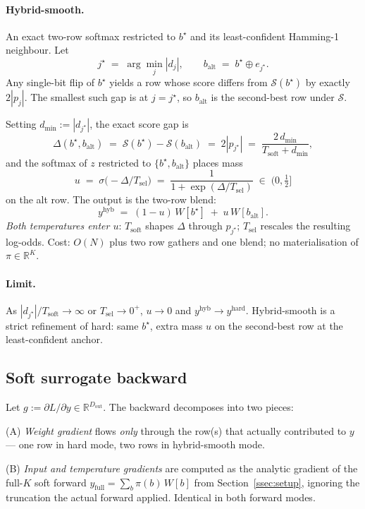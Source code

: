 \documentclass[11pt]{article}
\newcommand{\R}{\mathbb{R}}
\newcommand{\Tsel}{T_{\mathrm{sel}}}
\newcommand{\Tsoft}{T_{\mathrm{soft}}}
\newcommand{\dout}{D_{\mathrm{out}}}
\newcommand{\bstar}{b^{\star}}
\newcommand{\jstar}{j^{\star}}
\begin{document}
\paragraph{Hybrid-smooth.} An exact two-row softmax restricted to $\bstar$ and its least-confident Hamming-1 neighbour. Let
\[
\jstar \;=\; \arg\min_{j} |d_j|, \qquad b_{\text{alt}} \;=\; \bstar \oplus e_{\jstar}.
\]
Any single-bit flip of $\bstar$ yields a row whose score differs from $\mathcal{S}(\bstar)$ by exactly $2|p_j|$. The smallest such gap is at $j = \jstar$, so $b_{\text{alt}}$ is the second-best row under $\mathcal{S}$.

\noindent Setting $d_{\min} := |d_{\jstar}|$, the exact score gap is
\[
\Delta(\bstar, b_{\text{alt}}) \;=\; \mathcal{S}(\bstar) - \mathcal{S}(b_{\text{alt}}) \;=\; 2|p_{\jstar}| \;=\; \frac{2\, d_{\min}}{\Tsoft + d_{\min}},
\]
and the softmax of $z$ restricted to $\{\bstar, b_{\text{alt}}\}$ places mass
\[
u \;=\; \sigma\!\bigl(-\Delta/\Tsel\bigr) \;=\; \frac{1}{1 + \exp(\Delta/\Tsel)} \;\in\; (0,\tfrac{1}{2}]
\]
on the alt row. The output is the two-row blend:
\[
\boxed{\;
y^{\text{hyb}} \;=\; (1-u)\, W[\bstar] \;+\; u\, W[b_{\text{alt}}].
\;}
\]
\emph{Both temperatures enter $u$}: $\Tsoft$ shapes $\Delta$ through $p_{\jstar}$; $\Tsel$ rescales the resulting log-odds. Cost: $O(N)$ plus two row gathers and one blend; no materialisation of $\pi \in \R^{K}$.

\paragraph{Limit.} As $|d_{\jstar}|/\Tsoft \to \infty$ or $\Tsel \to 0^+$, $u \to 0$ and $y^{\text{hyb}} \to y^{\text{hard}}$. Hybrid-smooth is a strict refinement of hard: same $\bstar$, extra mass $u$ on the second-best row at the least-confident anchor.

\subsection{Soft surrogate backward}
\label{ssec:backward}

Let $g := \partial L/\partial y \in \R^{\dout}$. The backward decomposes into two pieces:

\medskip
\noindent (A)\; \emph{Weight gradient} flows \emph{only} through the row(s) that actually contributed to $y$ --- one row in hard mode, two rows in hybrid-smooth mode.

\noindent (B)\; \emph{Input and temperature gradients} are computed as the analytic gradient of the full-$K$ soft forward $y_{\text{full}} = \sum_b \pi(b)\, W[b]$ from Section~\ref{ssec:setup}, ignoring the truncation the actual forward applied. Identical in both forward modes.
\end{document}
